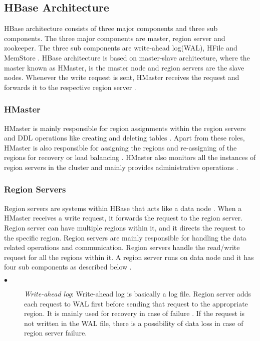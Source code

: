\documentclass[11pt,a4paper,bibtotoc,idxtotoc,headsepline,footsepline,footexclude,BCOR12mm,DIV13]{scrbook}
\begin{document}

\newpage
\subsection{HBase Architecture}
\label{HBase Architecture}

HBase architecture consists of three major components and three sub components. The three major components are master, region server and zookeeper. The three sub components are write-ahead log(WAL), HFile and MemStore \cite{hbase:insights}. HBase architecture is based on master-slave architecture, where the master known as HMaster, is the master node and region servers are the slave nodes. Whenever the write request is sent, HMaster receives the request and forwards it to the respective region server \cite{hbase:insights}. 

\subsubsection{HMaster}
\label{hmaster}

HMaster is mainly responsible for region assignments within the region servers and DDL operations like creating and deleting tables \cite{hbase:architecture}. Apart from these roles, HMaster is also responsible for assigning the regions and re-assigning of the regions for recovery or load balancing \cite{hbase:architecture}. HMaster also monitors all the instances of region servers in the cluster and mainly provides administrative operations \cite{hbase:architecture}.

\subsubsection{Region Servers}
\label{region serves}

Region servers are systems within HBase that acts like a data node \cite{hbase:insights}. When a HMaster receives a write request, it forwards the request to the region server. Region server can have multiple regions within it, and it directs the request to the specific region. Region servers are mainly responsible for handling the data related operations and communication. Region servers handle the read/write request for all the regions within it. 
A region server runs on data node and it has four sub components as described below \cite{hbase:architecture}.
\begin{description}
	\item[$\bullet$]  \emph{Write-ahead log}: Write-ahead log is basically a log file. Region server adds each request to WAL first before sending that request to the appropriate region. It is mainly used for recovery in case of failure \cite{hbase:insights}. If the request is not written in the WAL file, there is a possibility of data loss in case of region server failure.
\end{description}
\end{document}
